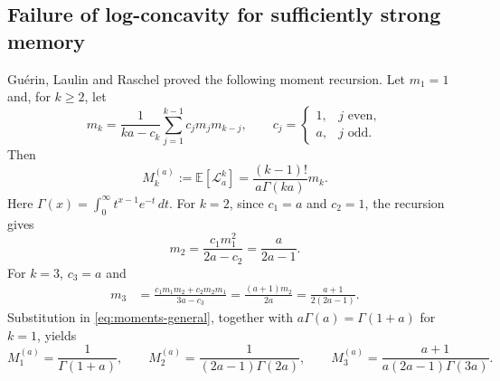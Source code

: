 \documentclass[11pt]{article}
\numberwithin{equation}{section}
\theoremstyle{remark}
\newcommand{\E}{\mathbb{E}}
\begin{document}

\subsection{Failure of log-concavity for sufficiently strong memory}

Gu\'erin, Laulin and Raschel \cite[Theorem 1.4]{guerin-laulin-raschel}
proved the following moment recursion. Let $m_1=1$ and, for $k\geq2$, let
\begin{equation}\label{eq:moment-rec}
 m_k=\frac{1}{ka-c_k}\sum_{j=1}^{k-1}c_jm_jm_{k-j},
 \qquad
 c_j=\begin{cases}1,&j\text{ even},\\ a,&j\text{ odd}.
 \end{cases}
\end{equation}
Then
\begin{equation}\label{eq:moments-general}
 M_k^{(a)}:=\E[\mathcal{L}_a^k]=\frac{(k-1)!}{a\Gamma(ka)}m_k.
\end{equation}
Here $\Gamma(x)=\int_0^\infty t^{x-1}e^{-t}\,dt$. For $k=2$, since
$c_1=a$ and $c_2=1$, the recursion gives
\[
 m_2=\frac{c_1m_1^2}{2a-c_2}=\frac{a}{2a-1}.
\]
For $k=3$, $c_3=a$ and
\begin{align*}
 m_3
 &=\frac{c_1m_1m_2+c_2m_2m_1}{3a-c_3}
 =\frac{(a+1)m_2}{2a}
 =\frac{a+1}{2(2a-1)}.
\end{align*}
Substitution in \eqref{eq:moments-general}, together with
$a\Gamma(a)=\Gamma(1+a)$ for $k=1$, yields
\begin{equation}\label{eq:three-moments}
 M_1^{(a)}=\frac1{\Gamma(1+a)},\qquad
 M_2^{(a)}=\frac1{(2a-1)\Gamma(2a)},\qquad
 M_3^{(a)}=\frac{a+1}{a(2a-1)\Gamma(3a)}.
\end{equation}
\end{document}
